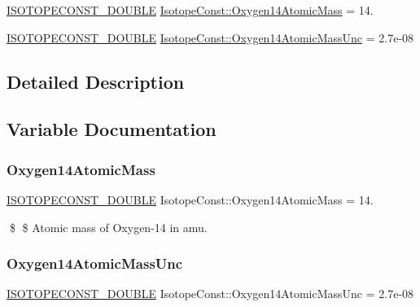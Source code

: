 \begin{DoxyCompactItemize}
\item 
\mbox{\hyperlink{group___isotope_const-_macros_ga8f45a7272ce02c0b4c65c44636ed719a}{I\+S\+O\+T\+O\+P\+E\+C\+O\+N\+S\+T\+\_\+\+D\+O\+U\+B\+LE}} \mbox{\hyperlink{group___isotope_const-_oxygen-_o14_ga7f6405b79d60403119c8314a2558648e}{Isotope\+Const\+::\+Oxygen14\+Atomic\+Mass}} = 14.
\item 
\mbox{\hyperlink{group___isotope_const-_macros_ga8f45a7272ce02c0b4c65c44636ed719a}{I\+S\+O\+T\+O\+P\+E\+C\+O\+N\+S\+T\+\_\+\+D\+O\+U\+B\+LE}} \mbox{\hyperlink{group___isotope_const-_oxygen-_o14_gaf49fd298b109085bd2a053b43b315f0b}{Isotope\+Const\+::\+Oxygen14\+Atomic\+Mass\+Unc}} = 2.\+7e-\/08
\end{DoxyCompactItemize}


\subsection{Detailed Description}


\subsection{Variable Documentation}
\mbox{\label{group___isotope_const-_oxygen-_o14_ga7f6405b79d60403119c8314a2558648e}} 
\subsubsection{\texorpdfstring{Oxygen14\+Atomic\+Mass}{Oxygen14AtomicMass}}
{\footnotesize\ttfamily \mbox{\hyperlink{group___isotope_const-_macros_ga8f45a7272ce02c0b4c65c44636ed719a}{I\+S\+O\+T\+O\+P\+E\+C\+O\+N\+S\+T\+\_\+\+D\+O\+U\+B\+LE}} Isotope\+Const\+::\+Oxygen14\+Atomic\+Mass = 14.}

\$ \$ Atomic mass of Oxygen-\/14 in amu. \mbox{\label{group___isotope_const-_oxygen-_o14_gaf49fd298b109085bd2a053b43b315f0b}} 
\subsubsection{\texorpdfstring{Oxygen14\+Atomic\+Mass\+Unc}{Oxygen14AtomicMassUnc}}
{\footnotesize\ttfamily \mbox{\hyperlink{group___isotope_const-_macros_ga8f45a7272ce02c0b4c65c44636ed719a}{I\+S\+O\+T\+O\+P\+E\+C\+O\+N\+S\+T\+\_\+\+D\+O\+U\+B\+LE}} Isotope\+Const\+::\+Oxygen14\+Atomic\+Mass\+Unc = 2.\+7e-\/08}

